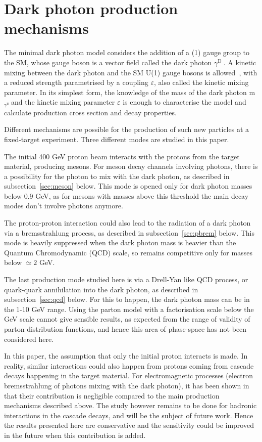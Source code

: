 \documentclass[12pt,a4paper]{article}
\newcommand{\mathDP}{\gamma^{\mathrm{D}}\ }
\newcommand{\DP}{$\mathDP$}
\newcommand{\mDP}{m$_{\mathDP}$}
\begin{document}
\section{Dark photon production mechanisms}
\label{sec:DPprod}

The minimal dark photon model considers the addition of a (1)
gauge group to the SM, whose gauge boson is a vector field called the
dark photon \DP. A kinetic mixing between the dark
photon and the SM U(1) gauge bosons is allowed~\cite{Holdom:1985ag}, with a
reduced strength parametrised by a coupling $\varepsilon$, also called
the kinetic mixing parameter. In its simplest form, the knowledge of
the mass of the dark photon \mDP and the kinetic
mixing parameter $\varepsilon$ is enough to characterise the model and
calculate production cross section and decay properties.

Different mechanisms are possible for the production of such new
particles at a fixed-target experiment. Three different modes are
studied in this paper.

The initial 400 GeV proton beam interacts with the protons from the
target material, producing mesons. For meson decay channels involving
photons, there is a possibility for the photon to mix with the dark
photon, as described in subsection~\ref{sec:meson} below. This mode is
opened only for dark photon masses below 0.9 GeV, as for mesons with
masses above this threshold the main decay modes don't involve photons
anymore.

The proton-proton interaction could also lead to the radiation of a
dark photon via a bremsstrahlung process, as described in
subsection~\ref{sec:pbrem} below. This mode is heavily suppressed when
the dark photon mass is heavier than the Quantum Chromodynamic (QCD)
scale, so remains competitive only for masses below $\simeq 2$ GeV.

The last production mode studied here is via a Drell-Yan like QCD
process, or quark-quark annihilation into the dark photon, as
described in subsection~\ref{sec:qcd} below. For this to happen, the
dark photon mass can be in the 1-10 GeV range. Using the parton model
with a factorisation scale below the GeV scale cannot give sensible
results, as expected from the range of validity of parton distribution
functions, and hence this area of phase-space has not been considered
here.

In this paper, the assumption that only the initial proton interacts
is made. In reality, similar interactions could also happen from
protons coming from cascade decays happening in the target
material. For electromagnetic processes (electron bremsstrahlung of
photons mixing with the dark photon), it has been shown
in~\cite{Gorbunov:2014wqa} that their contribution is negligible
compared to the main production mechanisms described above. The study
however remains to be done for hadronic interactions in the cascade
decays, and will be the subject of future work. Hence the results
presented here are conservative and the sensitivity could be improved
in the future when this contribution is added.
\end{document}
